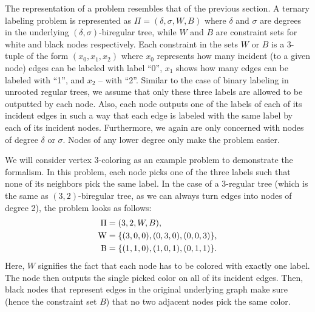The representation of a problem resembles that of the previous section. A
ternary labeling problem is represented as $\Pi = (\delta, \sigma, W, B)$
where $\delta$ and $\sigma$ are degrees in the underlying $(\delta, \sigma)$-biregular
tree, while $W$ and $B$ are constraint sets for white and black nodes respectively.
Each constraint in the sets $W$ or $B$ is a 3-tuple of the form $(x_0, x_1, x_2)$
where $x_0$ represents how many incident (to a given node) edges can be labeled with label ``0'',
$x_1$ shows how many edges can be labeled with ``1'', and $x_2$ -- with ``2''. Similar to the case
of binary labeling in unrooted regular trees, we assume that only these three labels are allowed to
be outputted by each node. Also, each node outputs one of the labels of each of its incident edges
in such a way that each edge is labeled with the same label by each of its incident nodes.
Furthermore, we again are only concerned with nodes of degree $\delta$ or $\sigma$. Nodes of
any lower degree only make the problem easier.

We will consider vertex 3-coloring as an example problem to demonstrate the formalism.
In this problem, each node picks one of the three labels such that none of its neighbors
pick the same label. In the case of a 3-regular tree (which is the same as $(3, 2)$-biregular tree,
as we can always turn edges into nodes of degree 2), the problem looks as follows:
\begin{align*}
  \Pi &= (3, 2, W, B), \\
  \operatorname{W} &= \{ (3, 0, 0), (0, 3, 0), (0, 0, 3) \}, \\
  \operatorname{B} &= \{ (1, 1, 0), (1, 0, 1), (0, 1, 1) \}.
\end{align*}
Here, $W$ signifies the fact that each node has to be colored with exactly one label. The node then outputs
the single picked color on all of its incident edges. Then, black nodes that represent edges in the
original underlying graph make sure (hence the constraint set $B$) that no two adjacent nodes
pick the same color.


